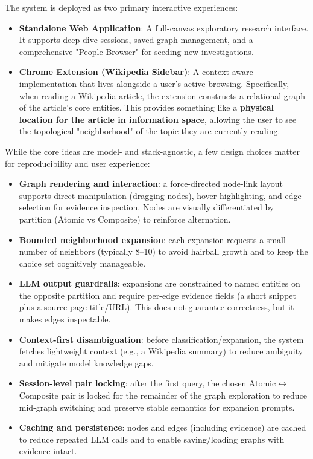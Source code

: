 The system is deployed as two primary interactive experiences:

\begin{itemize}[leftmargin=*]

\item \textbf{Standalone Web Application}: A full-canvas exploratory research interface. It supports deep-dive sessions, saved graph management, and a comprehensive "People Browser" for seeding new investigations.

\item \textbf{Chrome Extension (Wikipedia Sidebar)}: A context-aware implementation that lives alongside a user's active browsing. Specifically, when reading a Wikipedia article, the extension constructs a relational graph of the article's core entities. This provides something like a \textbf{physical location for the article in information space}, allowing the user to see the topological "neighborhood" of the topic they are currently reading.

\end{itemize}

While the core ideas are model- and stack-agnostic, a few design choices matter for reproducibility and user experience:

\begin{itemize}[leftmargin=*]

\item \textbf{Graph rendering and interaction}: a force-directed node-link layout supports direct manipulation (dragging nodes), hover highlighting, and edge selection for evidence inspection. Nodes are visually differentiated by partition (Atomic vs Composite) to reinforce alternation.

\item \textbf{Bounded neighborhood expansion}: each expansion requests a small number of neighbors (typically 8--10) to avoid hairball growth and to keep the choice set cognitively manageable.

\item \textbf{LLM output guardrails}: expansions are constrained to named entities on the opposite partition and require per-edge evidence fields (a short snippet plus a source page title/URL). This does not guarantee correctness, but it makes edges inspectable.

\item \textbf{Context-first disambiguation}: before classification/expansion, the system fetches lightweight context (e.g., a Wikipedia summary) to reduce ambiguity and mitigate model knowledge gaps.

\item \textbf{Session-level pair locking}: after the first query, the chosen Atomic\(\leftrightarrow\)Composite pair is locked for the remainder of the graph exploration to reduce mid-graph switching and preserve stable semantics for expansion prompts.

\item \textbf{Caching and persistence}: nodes and edges (including evidence) are cached to reduce repeated LLM calls and to enable saving/loading graphs with evidence intact.

\end{itemize}

